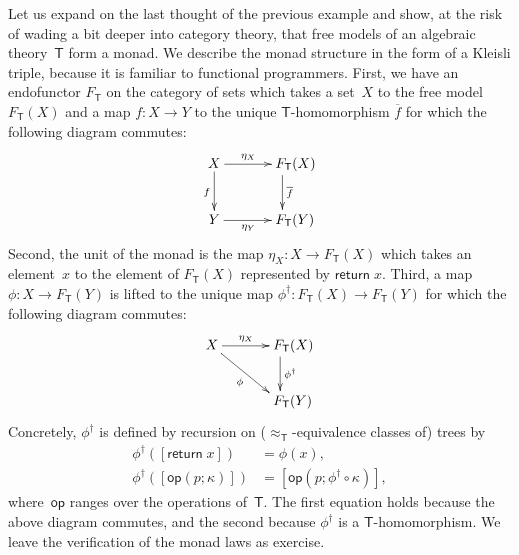 \documentclass{amsart}
\newcommand{\theory}[1]{\mathsf{#1}} %
\newcommand{\Free}[2]{F_{\theory{#1}}(#2)} %
\newcommand{\FreeFun}[1]{F_{\theory{#1}}} %
\newcommand{\lift}[1]{#1^\dagger} %
\newcommand{\kode}[1]{\mathsf{#1}}
\newcommand{\opcall}[3]{\kode{#1}(#2; #3)}
\newcommand{\return}[1]{\kode{return}\;#1}
\begin{document}
Let us expand on the last thought of the previous example and show, at the risk
of wading a bit deeper into category theory, that free models of an algebraic
theory~$\theory{T}$ form a monad. We describe the monad structure in the form of
a Kleisli triple, because it is familiar to functional programmers. First, we
have an endofunctor $\FreeFun{T}$ on the category of sets which takes a set~$X$
to the free model $\Free{T}{X}$ and a map $f : X \to Y$ to the unique
$\theory{T}$-homomorphism $\overline{f}$ for which the following diagram
commutes:
%
\begin{equation*}
  \xymatrix{
    {X}
    \ar[r]^{\eta_X}
    \ar[d]_{f}
    &
    **[r]{\Free{T}{X}}
    \ar[d]^{\overline{f}}
    \\
    {Y}
    \ar[r]_{\eta_Y}
    &
    **[r]{\Free{T}{Y}}
  }
\end{equation*}
%
Second, the unit of the monad is the map $\eta_X : X \to \Free{T}{X}$ which
takes an element~$x$ to the element of $\Free{T}{X}$ represented by
$\return{x}$. Third, a map $\phi : X \to \Free{T}{Y}$ is lifted to the unique map
$\lift{\phi} : \Free{T}{X} \to \Free{T}{Y}$ for which the following diagram commutes:
%
\begin{equation*}
  \xymatrix{
    {X}
    \ar[r]^{\eta_X}
    \ar[rd]_{\phi}
    &
    **[r]{\Free{T}{X}}
    \ar[d]^{\lift{\phi}}
    \\
    &
    **[r]{\Free{T}{Y}}
  }
\end{equation*}
%
Concretely, $\lift{\phi}$ is defined by recursion on
($\approx_{\theory{T}}$-equivalence classes of) trees by
%
\begin{align*}
  \lift{\phi}([\return{x}]) &= \phi(x), \\
  \lift{\phi}([\opcall{op}{p}{\kappa}]) &= [\opcall{op}{p}{\lift{\phi} \circ \kappa}],
\end{align*}
%
where~$\kode{op}$ ranges over the operations of~$\theory{T}$. The first equation
holds because the above diagram commutes, and the second because $\lift{\phi}$ is a
$\theory{T}$-homomorphism. We leave the verification of the monad laws as
exercise.
\end{document}
